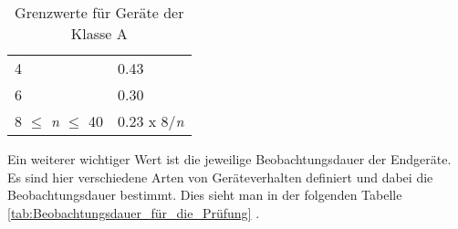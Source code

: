 \begin{appendix}
\begin{table}[ht!]
\begin{tabular}{|l|l|}
		4                                            & 0.43                                                                                                                \\
		6                                            & 0.30                                                                                                                \\
		8 $\leq$ \textit{n} $\leq$ 40                & 0.23 x 8/\textit{n}                                                                                                 \\ \hline
	\end{tabular}
	\caption{Grenzwerte für Geräte der Klasse A}\label{tab:Grenzwerte_Normen_ZF}
\end{table}


Ein weiterer wichtiger Wert ist die jeweilige Beobachtungsdauer der Endgeräte. Es sind hier verschiedene Arten von Geräteverhalten definiert und dabei die Beobachtungsdauer bestimmt. Dies sieht man in der folgenden Tabelle \ref{tab:Beobachtungsdauer_für_die_Prüfung} \cite{EMVNorm}.


\end{appendix}

